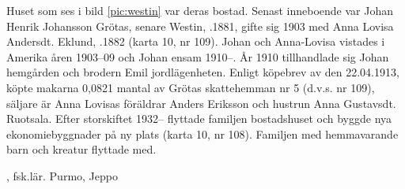 %
Huset som ses i bild \ref{pic:westin} var deras bostad. Senast inneboende var Johan Henrik Johansson Grötas, senare Westin, .1881, gifte sig 1903 med Anna Lovisa Andersdt. Eklund, .1882 (karta 10, nr 109). Johan och Anna-Lovisa vistades i Amerika åren 1903--09 och Johan ensam 1910--. År 1910 tillhandlade sig Johan hemgården och brodern Emil jordlägenheten. Enligt köpebrev av den 22.04.1913, köpte makarna 0,0821 mantal av Grötas skattehemman nr 5 (d.v.s. nr 109), säljare är Anna Lovisas föräldrar Anders Eriksson och hustrun Anna Gustavsdt. Ruotsala. Efter storskiftet 1932-- flyttade familjen bostadshuset och byggde nya ekonomiebyggnader på ny plats (karta 10, nr 108). Familjen med hemmavarande barn och kreatur flyttade med.
\begin{jhchildren}
  \item {}, fsk.lär. Purmo, Jeppo
  \item {}
  \item {}
  \item {}
  \item {}
  \item {}
  \item {}
  \item {}
  \item {}
  \item {}
\end{jhchildren}



